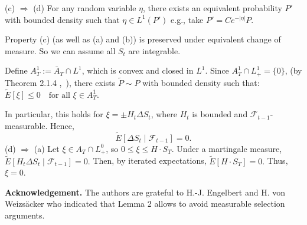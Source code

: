 \documentclass[review]{elsarticle}
\begin{document}
\hspace{0.5cm}(c) $\Rightarrow$ (d)
For any random variable $\eta$, there exists an equivalent probability $P'$ with bounded density such that $\eta \in L^1(P')$ e.g., take $P' = C e^{-|\eta|} P$.

Property (c) (as well as (a) and (b)) is preserved under equivalent change of measure.  
So we can assume all $S_t$ are integrable.

Define $A_T^1 := \bar{A}_T \cap L^1$, which is convex and closed in $L^1$.  
Since $A_T^1 \cap L_+^1 = \{0\}$, (by Theorem 2.1.4 ,~\cite{Kabanov2009}), there exists $\tilde{P} \sim P$ with bounded density such that:
$
\tilde{E}[\xi] \leq 0 \quad \text{for all } \xi \in A_T^1.
$

In particular, this holds for $\xi = \pm H_t \Delta S_t$, where $H_t$ is bounded and $\mathcal{F}_{t-1}$-measurable.  
Hence,
$$
\tilde{E}[\Delta S_t \mid \mathcal{F}_{t-1}] = 0.
$$
\hspace{0.5cm}(d) $\Rightarrow$ (a) 
Let $\xi \in A_T \cap L_+^0$, so $0 \leq \xi \leq H \cdot S_T$.  
Under a martingale measure,\\
$
\tilde{E}[H_t \Delta S_t \mid \mathcal{F}_{t-1}] = 0.
$
Then, by iterated expectations,
$
\tilde{E}[H \cdot S_T] = 0.
$
Thus, $\xi = 0$.




\textbf{Acknowledgement.} The authors are grateful to H.-J. Engelbert and H. von Weizsäcker who indicated that Lemma 2 allows to avoid measurable selection arguments.














\end{document}
